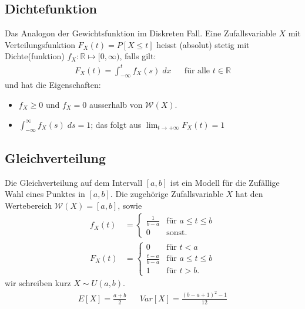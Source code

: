 \documentclass[8pt]{extarticle}
\newcommand{\R}{\mathbb{R}}
\newcommand{\W}{\mathcal{W}}
\newcommand{\ra}{\rightarrow}
\begin{document}
\begin{multicols*}{3}
  \subsection*{Dichtefunktion}
  Das Analogon der Gewichtsfunktion im Diskreten Fall. Eine Zufallsvariable
  $X$ mit Verteilungsfunktion $F_X(t) = P[X \leq t]$ heisst (absolut)
  stetig mit Dichte(funktion) $f_X : \R \mapsto [0, \infty)$, falls gilt:
  \begin{align*}
    F_X(t) = \int_{-\infty}^t f_X(s) \; dx &  & \text{für alle } t \in \R
  \end{align*}
  und hat die Eigenschaften:
  \begin{itemize}
    \item $f_X \geq 0$ und $f_X = 0$ ausserhalb von $\W(X)$.
    \item $\int_{-\infty}^\infty f_X(s) \; ds = 1$;
          das folgt aus $\lim_{t \ra + \infty} F_X(t) = 1$
  \end{itemize}
  \subsection*{Gleichverteilung}
  Die Gleichverteilung auf dem Intervall $[a, b]$ ist ein Modell für
  die Zufällige Wahl eines Punktes in $[a, b]$. Die zugehörige
  Zufallsvariable $X$ hat den Wertebereich $\W(X) = [a, b]$, sowie
  \begin{align*}
    f_X(t) & =
    \begin{cases}
      \frac{1}{b-a} & \text{für } a \leq t \leq b \\
      0             & \text{sonst.}
    \end{cases} \\
    F_X(t) & =
    \begin{cases}
      0               & \text{für } t < a           \\
      \frac{t-a}{b-a} & \text{für } a \leq t \leq b \\
      1               & \text{für } t > b.
    \end{cases}
  \end{align*}
  wir schreiben kurz $X \sim U(a, b)$.
  \begin{align*}
    E[X] = \frac{a + b}{2} &  & Var[X] = \frac{(b - a + 1)^2 - 1}{12}
  \end{align*}

\end{multicols*}
\end{document}
